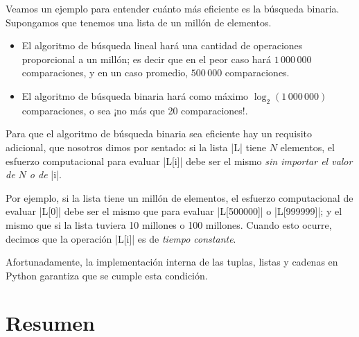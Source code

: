 Veamos un ejemplo para entender cuánto más eficiente es la búsqueda binaria.
Supongamos que tenemos una lista de un millón de elementos.

\begin{itemize}
\item El algoritmo de búsqueda lineal hará una cantidad de operaciones proporcional
a un millón; es decir que en el peor caso hará $1\,000\,000$ comparaciones, y en
un caso promedio, $500\,000$ comparaciones.
\item El algoritmo de búsqueda binaria hará como máximo $\log_2(1\,000\,000)$
comparaciones, o sea ¡no más que 20 comparaciones!.
\end{itemize}

\label{lookup-listas}
\begin{sabias_que}
    Para que el algoritmo de búsqueda binaria sea eficiente hay un requisito
    adicional, que nosotros dimos por sentado: si la lista |L| tiene $N$ elementos,
    el esfuerzo computacional para evaluar |L[i]| debe ser el mismo \emph{sin
    importar el valor de $N$ o de} |i|.

    Por ejemplo, si la lista tiene un millón de elementos, el esfuerzo
    computacional de evaluar |L[0]| debe ser el mismo que para evaluar
    |L[500000]| o |L[999999]|; y el mismo que si la lista tuviera 10 millones o
    100 millones.  Cuando esto ocurre, decimos que la operación |L[i]| es de
    \emph{tiempo constante}.

    Afortunadamente, la implementación interna de las tuplas, listas y cadenas
    en Python garantiza que se cumple esta condición.
\end{sabias_que}

\section{Resumen}

